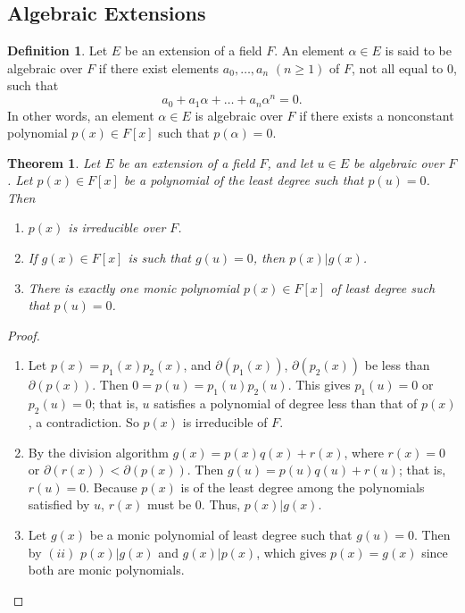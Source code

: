 \documentclass[draft]{article}
\newtheorem{thm}{Theorem}[section]
\theoremstyle{definition}
\newtheorem{defn}{Definition}[section]
\theoremstyle{remark}
\begin{document}
		\subsection{Algebraic Extensions}
		
		    \begin{defn}
                Let $E$ be an extension of a field $F$. An element $\alpha \in E$ is said to be algebraic over $F$ if there exist elements $a_0, \dots, a_n$ $(n \geq 1)$ of $F$, not all equal to 0, such that
                \begin{equation*}
                    a_0 + a_1\alpha + \dots + a_n\alpha^n = 0.
                \end{equation*}
                In other words, an element $\alpha \in E$ is algebraic over $F$ if there exists a nonconstant polynomial $p(x) \in F[x]$ such that $p(\alpha) = 0$.
            \end{defn}
            
            \begin{thm}
                Let $E$ be an extension of a field $F$, and let $u \in E$ be algebraic over $F$. Let $p(x) \in F[x]$ be a polynomial of the least degree such that $p(u) = 0$. Then
                \begin{enumerate}
                \renewcommand{\labelenumi}{(\roman{enumi})}
                    \item $p(x)$ is irreducible over $F$.
                    \item If $g(x) \in F[x]$ is such that $g(u) = 0$, then $p(x) | g(x)$.
                    \item There is exactly one monic polynomial $p(x) \in F[x]$ of least degree such that $p(u) = 0$.
                \end{enumerate}
            \end{thm}
            
            \begin{proof}
                \begin{enumerate}
                \renewcommand{\labelenumi}{(\roman{enumi})}
                    \item Let $p(x) = p_1(x)p_2(x)$, and $\partial(p_1(x))$, $\partial(p_2(x))$ be less than $\partial(p(x))$. Then $0 = p(u) = p_1(u)p_2(u)$. This gives $p_1(u) = 0$ or $p_2(u) = 0$; that is, $u$ satisfies a polynomial of degree less than that of $p(x)$, a contradiction. So $p(x)$ is irreducible of $F$.
                    \item By the division algorithm $g(x) = p(x)q(x) + r(x)$, where $r(x) = 0$ or $\partial(r(x)) < \partial(p(x))$. Then $g(u) = p(u)q(u) + r(u)$; that is, $r(u) = 0$. Because $p(x)$ is of the least degree among the polynomials satisfied by $u$, $r(x)$ must be 0. Thus, $p(x) | g(x)$.
                    \item Let $g(x)$ be a monic polynomial of least degree such that $g(u) = 0$. Then by $(ii)$ $p(x) | g(x)$ and $g(x) | p(x)$, which gives $p(x) = g(x)$ since both are monic polynomials.
                \end{enumerate}
            \end{proof}
            
\end{document}
